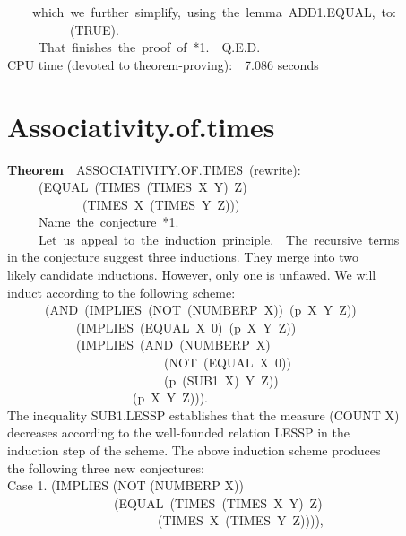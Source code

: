 \documentclass[10pt]{book}
\newenvironment{pubasis}{\begin{flushleft}}{\end{flushleft}}
\newcommand{\axiomordefinition}[1]{\vspace{6pt}\Large\textsf{\textbf{#1}}\normalsize}
\begin{document}
\begin{pubasis}
~~~~which~we~further~simplify,~using~the~lemma~ADD1.EQUAL,~to:\\

~~~~~~~~~~(TRUE).\\

~~~~~That~finishes~the~proof~of~*1.~~Q.E.D.\\

CPU time (devoted to theorem-proving):~~7.086 seconds\\
\end{pubasis}
\section{Associativity.of.times}
\begin{pubasis}
\axiomordefinition{Theorem}~~ASSOCIATIVITY.OF.TIMES~(rewrite):\\
~~~~~(EQUAL~(TIMES~(TIMES~X~Y)~Z)\\
~~~~~~~~~~~~(TIMES~X~(TIMES~Y~Z)))\\

~~~~~Name~the~conjecture~*1.\\

~~~~~Let~us~appeal~to~the~induction~principle.~~The~recursive~terms\\
in the conjecture suggest three inductions.  They merge into two\\
likely candidate inductions.  However, only one is unflawed.  We will\\
induct according to the following scheme:\\
~~~~~~(AND~(IMPLIES~(NOT~(NUMBERP~X))~(p~X~Y~Z))\\
~~~~~~~~~~~(IMPLIES~(EQUAL~X~0)~(p~X~Y~Z))\\
~~~~~~~~~~~(IMPLIES~(AND~(NUMBERP~X)\\
~~~~~~~~~~~~~~~~~~~~~~~~~(NOT~(EQUAL~X~0))\\
~~~~~~~~~~~~~~~~~~~~~~~~~(p~(SUB1~X)~Y~Z))\\
~~~~~~~~~~~~~~~~~~~~(p~X~Y~Z))).\\
The inequality SUB1.LESSP establishes that the measure (COUNT X)\\
decreases according to the well-founded relation LESSP in the\\
induction step of the scheme.  The above induction scheme produces\\
the following three new conjectures:\\

Case 1.	(IMPLIES (NOT (NUMBERP X))\\
~~~~~~~~~~~~~~~~~(EQUAL~(TIMES~(TIMES~X~Y)~Z)\\
~~~~~~~~~~~~~~~~~~~~~~~~(TIMES~X~(TIMES~Y~Z)))),\\


\end{pubasis}
\end{document}
